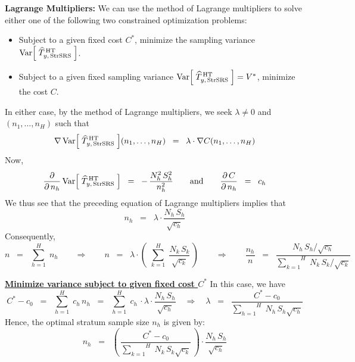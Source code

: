 \vskip 0.5cm
\noindent
\textbf{Lagrange Multipliers:}
\vskip 0.1cm
\noindent
We can use the method of Lagrange multipliers to solve
either one of the following two constrained optimization problems:
\begin{itemize}
\item
	Subject to a given fixed cost $C^{*}$, minimize the sampling variance
	$\textnormal{Var}\!\left[\;\widehat{T}^{\,\textnormal{HT}}_{y,\,\textnormal{StrSRS}}\;\right]$. 
\item
	Subject to a given fixed sampling variance
	$\textnormal{Var}\!\left[\;\widehat{T}^{\,\textnormal{HT}}_{y,\,\textnormal{StrSRS}}\;\right] = V^{*}$,
	minimize the cost $C$.
\end{itemize}
In either case, by the method of Lagrange multipliers, we seek $\lambda \neq 0$ and 
$(n_{1},\ldots,n_{H})$ such that
\begin{equation*}
\nabla\,\textnormal{Var}\!\left[\;\widehat{T}^{\,\textnormal{HT}}_{y,\,\textnormal{StrSRS}}\;\right]\!(n_{1},\ldots,n_{H})
\;\; = \;\;
	\lambda\cdot\nabla C(n_{1},\ldots,n_{H})
\end{equation*}
Now,
\begin{equation*}
\dfrac{\partial}{\partial\,n_{h}}\,\textnormal{Var}\!\left[\;\widehat{T}^{\,\textnormal{HT}}_{y,\,\textnormal{StrSRS}}\;\right]
\;\; = \;\;
	-\,\dfrac{N_{h}^{2}\,S_{h}^{2}}{n_{h}^{2}}
\quad\quad
\textnormal{and}
\quad\quad
\dfrac{\partial\,C}{\partial\,n_{h}} \;\; = \;\; c_{h}
\end{equation*}
We thus see that the preceding equation of Lagrange multipliers implies that
\begin{equation*}
n_{h} \;\; = \;\; \lambda \cdot \dfrac{N_{h}\,S_{h}}{\sqrt{c_{h}}}
\end{equation*}
Consequently,
\begin{equation*}
n \;\; = \;\; \overset{H}{\underset{h=1}{\sum}}\;n_{h}
\quad\quad
\Longrightarrow
\quad\quad
n
\;\; = \;\;
	\lambda
	\cdot
	\left(\,\,\overset{H}{\underset{k=1}{\sum}}\;\dfrac{N_{k}\,S_{k}}{\sqrt{c_{k}}}\,\right)
\quad\quad
\Longrightarrow
\quad\quad
\dfrac{n_{h}}{n}
\;\; = \;\;
	\dfrac{
		N_{h}\,S_{h}/\sqrt{c_{h}}
		}{
		\overset{H}{\underset{k=1}{\sum}}\;N_{k}\,S_{k}/\sqrt{c_{k}}
		}
\end{equation*}


\vskip 0.5cm
\noindent
\underline{\textbf{Minimize variance subject to given fixed cost $C^{*}$}}
\vskip 0.1cm
\noindent
In this case, we have
\begin{equation*}
C^{*} - c_{0}
\;\; = \;\;
	\overset{H}{\underset{h=1}{\sum}}\; c_{h}\,n_{h}
\;\; = \;\;
	\overset{H}{\underset{h=1}{\sum}}\; c_{h}\,\cdot \lambda \cdot \dfrac{N_{h}\,S_{h}}{\sqrt{c_{h}}}
\quad
\Longrightarrow
\quad
\lambda
\;\; = \;\;
	\dfrac{C^{*} - c_{0}
		}{
		\overset{H}{\underset{h=1}{\sum}}\;N_{h}\,S_{h}\sqrt{c_{h}}
		}
\end{equation*}
Hence, the optimal stratum sample size $n_{h}$ is given by:
\begin{equation*}
n_{h}
\;\; = \;\;
	\left(\,\dfrac{C^{*} - c_{0}}{\overset{H}{\underset{k=1}{\sum}}\;N_{k}\,S_{k}\sqrt{c_{k}}}\,\right)
	\cdot
	\dfrac{N_{h}\,S_{h}}{\sqrt{c_{h}}}
\end{equation*}


